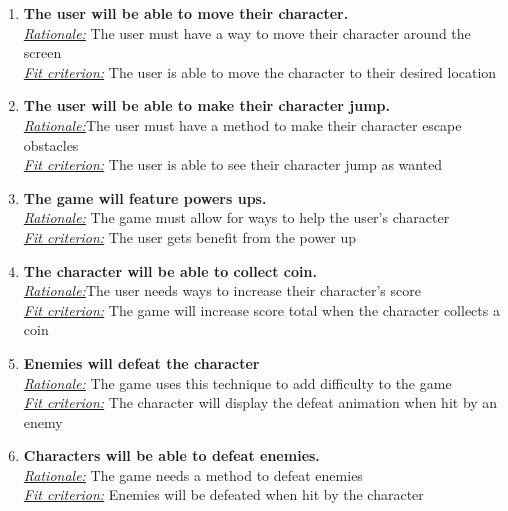 \documentclass[12pt, titlepage]{article}
\begin{document}
\begin{enumerate}
\item \textbf{The user will be able to move their character.}\\
\underline{\textit{Rationale:}} The user must have a way to move their character around the screen\\
\underline{\textit{Fit criterion:}} The user is able to move the character to their desired location\\

\item \textbf{The user will be able to make their character jump.} \\
\underline{\textit{Rationale:}}The user must have a method to make their character escape obstacles\\
\underline{\textit{Fit criterion:}} The user is able to see their character jump as wanted\\

\item \textbf{The game will feature powers ups.}\\
\underline{\textit{Rationale:}} The game must allow for ways to help the user's character\\
\underline{\textit{Fit criterion:}} The user gets benefit from the power up\\

\item \textbf{The character will be able to collect coin.}\\
\underline{\textit{Rationale:}}The user needs ways to increase their character's score\\
\underline{\textit{Fit criterion:}} The game will increase score total when the character collects a coin  \\

\item \textbf{Enemies will defeat the character}\\
\underline{\textit{Rationale:}} The game uses this technique to add difficulty to the game\\
\underline{\textit{Fit criterion:}} The character will display the defeat animation when hit by an enemy\\

\item \textbf{Characters will be able to defeat enemies.}\\
\underline{\textit{Rationale:}} The game needs a method to defeat enemies\\
\underline{\textit{Fit criterion:}} Enemies will be defeated when hit by the character\\


\end{enumerate}
\end{document}
